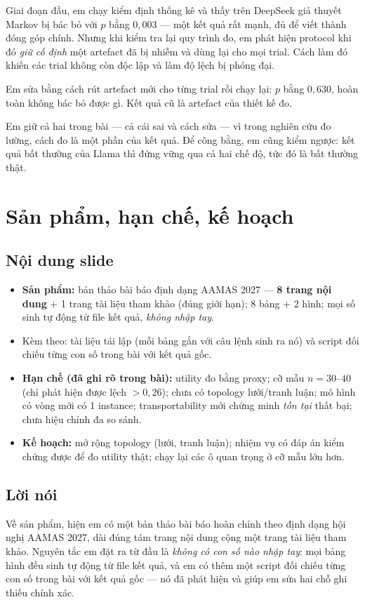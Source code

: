 \documentclass[11pt,a4paper]{article}
\newcommand{\slide}[1]{\section{#1}}
\newcommand{\noidung}{\subsection*{Nội dung slide}}
\newcommand{\loinoi}{\subsection*{Lời nói}}
\begin{document}
Giai đoạn đầu, em chạy kiểm định thống kê và thấy trên DeepSeek giả thuyết Markov bị bác
bỏ với $p$ bằng $0{,}003$ --- một kết quả rất mạnh, đủ để viết thành đóng góp chính.
Nhưng khi kiểm tra lại quy trình đo, em phát hiện protocol khi đó \emph{giữ cố định} một
artefact đã bị nhiễm và dùng lại cho mọi trial. Cách làm đó khiến các trial không còn độc
lập và làm độ lệch bị phóng đại.

Em sửa bằng cách rút artefact mới cho từng trial rồi chạy lại: $p$ bằng $0{,}630$, hoàn
toàn không bác bỏ được gì. Kết quả cũ là artefact của thiết kế đo.

Em giữ cả hai trong bài --- cả cái sai và cách sửa --- vì trong nghiên cứu đo lường, cách
đo là một phần của kết quả. Để công bằng, em cũng kiểm ngược: kết quả bất thường của
Llama thì đứng vững qua cả hai chế độ, tức đó là bất thường thật.

\slide{Sản phẩm, hạn chế, kế hoạch}

\noidung
\begin{itemize}
  \item \textbf{Sản phẩm:} bản thảo bài báo định dạng AAMAS 2027 --- \textbf{8 trang nội
        dung} + 1 trang tài liệu tham khảo (đúng giới hạn); 8 bảng + 2 hình; mọi số sinh
        tự động từ file kết quả, \emph{không nhập tay}.
  \item Kèm theo: tài liệu tái lập (mỗi bảng gắn với câu lệnh sinh ra nó) và script đối
        chiếu từng con số trong bài với kết quả gốc.
  \item \textbf{Hạn chế (đã ghi rõ trong bài):} utility đo bằng proxy; cỡ mẫu $n=30$--$40$
        (chỉ phát hiện được lệch $>0{,}26$); chưa có topology lưới/tranh luận; mô hình có
        vòng mới có 1 instance; transportability mới chứng minh \emph{tồn tại} thất bại;
        chưa hiệu chỉnh đa so sánh.
  \item \textbf{Kế hoạch:} mở rộng topology (lưới, tranh luận); nhiệm vụ có đáp án kiểm
        chứng được để đo utility thật; chạy lại các ô quan trọng ở cỡ mẫu lớn hơn.
\end{itemize}

\loinoi
Về sản phẩm, hiện em có một bản thảo bài báo hoàn chỉnh theo định dạng hội nghị AAMAS
2027, dài đúng tám trang nội dung cộng một trang tài liệu tham khảo. Nguyên tắc em đặt ra
từ đầu là \emph{không có con số nào nhập tay}: mọi bảng hình đều sinh tự động từ file kết
quả, và em có thêm một script đối chiếu từng con số trong bài với kết quả gốc --- nó đã
phát hiện và giúp em sửa hai chỗ ghi thiếu chính xác.
\end{document}
